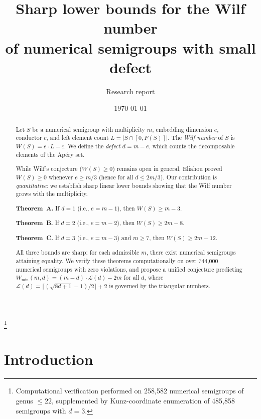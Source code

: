 \documentclass[11pt]{amsart}
\theoremstyle{definition}
\theoremstyle{remark}
\begin{document}
\title[Sharp lower bounds for the Wilf number]{Sharp lower bounds for the Wilf number\\of numerical semigroups with small defect}

\author{Research report}

\date{\today}

\thanks{Computational verification performed on 258{,}582 numerical semigroups of genus $\le 22$, supplemented by Kunz-coordinate enumeration of 485{,}858 semigroups with $d = 3$.}

\begin{abstract}
Let $S$ be a numerical semigroup with multiplicity $m$, embedding dimension $e$,
conductor $c$, and left element count $L = |S \cap [0, F(S)]|$.
The \emph{Wilf number} of $S$ is $W(S) = e \cdot L - c$.
We define the \emph{defect} $d = m - e$, which counts the decomposable elements
of the Ap\'ery set.

While Wilf's conjecture ($W(S) \ge 0$) remains open in general,
Eliahou proved $W(S) \ge 0$ whenever $e \ge m/3$ (hence for all $d \le 2m/3$).
Our contribution is \emph{quantitative}: we establish sharp linear lower bounds
showing that the Wilf number grows with the multiplicity.

\textbf{Theorem~A.} If $d = 1$ (i.e., $e = m - 1$), then $W(S) \ge m - 3$.

\textbf{Theorem~B.} If $d = 2$ (i.e., $e = m - 2$), then $W(S) \ge 2m - 8$.

\textbf{Theorem~C.} If $d = 3$ (i.e., $e = m - 3$) and $m \ge 7$, then $W(S) \ge 2m - 12$.

All three bounds are sharp: for each admissible $m$, there exist numerical semigroups
attaining equality.
We verify these theorems computationally on over 744{,}000 numerical semigroups
with zero violations, and propose a unified conjecture
predicting $W_{\min}(m,d) = (m - d) \cdot \mathcal{L}(d) - 2m$ for all $d$,
where $\mathcal{L}(d) = \lceil (\sqrt{8d+1} - 1)/2 \rceil + 2$
is governed by the triangular numbers.
\end{abstract}

\maketitle
\setcounter{tocdepth}{2}
\tableofcontents

\section{Introduction}\label{sec:intro}
\end{document}
